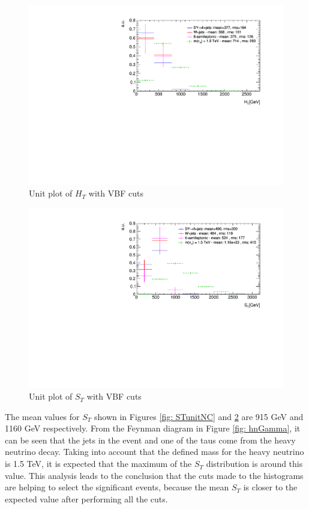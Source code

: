 \begin{figure}
\begin{center}
 \includegraphics[width=\linewidth]{Plots/HT_unitVBF.pdf}
\end{center}
\caption{Unit plot of $H_{T}$ with VBF cuts}
\label{fig: HTunitVBF}
\end{figure}

\begin{figure}
\centering
\includegraphics[width=\linewidth]{Plots/ST_unitVBF.pdf}
\caption{Unit plot of $S_{T}$ with VBF cuts}
\label{fig: STunitVBF}
\end{figure}

The mean values for $S_{T}$ shown in Figures \ref{fig: STunitNC} and \ref{fig: STunitVBF} are 915 GeV and 1160 GeV respectively. From the Feynman diagram in Figure \ref{fig: hnGamma}, it can be seen that the jets in the event and one of the taus come from the heavy neutrino decay. Taking into account that the defined mass for the heavy neutrino is 1.5 TeV, it is expected that the maximum of the $S_{T}$ distribution is around this value. This analysis leads to the conclusion that the cuts made to the histograms are helping to select the significant events, because the mean $S_{T}$ is closer to the expected value after performing all the cuts.

